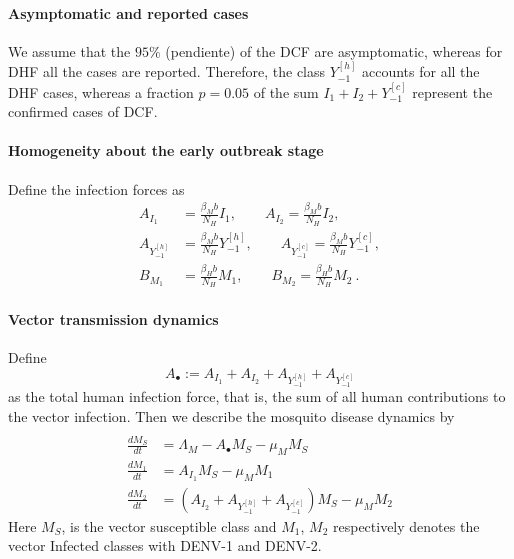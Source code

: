 \paragraph{Asymptomatic and reported cases}


We assume that the $95\%$ (pendiente) of the \ac{DCF} are asymptomatic, whereas for 
\ac{DHF}  all the cases are reported. Therefore, the class $Y_{-1}^{[h]}$ accounts for
all the \ac{DHF} cases, whereas a fraction $p=0.05$ of the sum $I_1+ I_2 + 
Y_{-1}^{[c]}$ represent the confirmed cases of \ac{DCF}.



\paragraph{Homogeneity about the early outbreak stage}

Define the infection forces as
\begin{equation}
	\begin{aligned}
		A_{I_1} &=
			\frac{\beta_Mb}{N_H} I_1, \qquad
		A_{I_2}=
			\frac{\beta_Mb}{N_H} I_2,
	\\
		A_{Y_{-1}^{[h]}}&=
		\frac{\beta_Mb}{N_H} Y_{-1} ^{[h]}, \qquad
		A_{Y_{-1}^{[c]}}=
			\frac{\beta_Mb}{N_H} Y_{-1}^{[c]},
	\\
		B_{M_1} &= 
			\frac{\beta_Hb}{N_H}M_1, \qquad
		B_{M_2}=
			\frac{\beta_Hb}{N_H}M_2 ~.
	\end{aligned}
\end{equation}
\paragraph{Vector transmission dynamics}
Define
$$
	A_{\bullet}:=
		A_{I_1} + A_{I_2} + A_{Y_{-1}^{[h]}} + 
		A_{Y_{-1}^{[c]}}
$$
as the total human infection force, that is, 
the sum of all
human contributions to the vector infection. 
Then we describe the mosquito disease dynamics 
by 
\begin{equation}
	\begin{aligned}
		\\
		\frac{dM_S}{dt}&=
			\Lambda_M
			- A_{\bullet} M_S
			- \mu_M M_S
		\\
		\frac{dM_1}{dt}&=
			A_{I_1}  M_S - \mu_M M_1
		\\
		\frac{dM_2}{dt} &=
			\left(
				A_{I_2}+A_{Y_{-1}^{[h]}}+A_{Y_{-1}^{[c]}}
			\right) 
			M_S-\mu_M M_2
	\end{aligned}
\end{equation}
Here $M_S$, is the vector susceptible class and
$M_1$, $M_2$ respectively denotes the vector 
Infected classes with \ac{DENV-1}
and \ac{DENV-2}.
